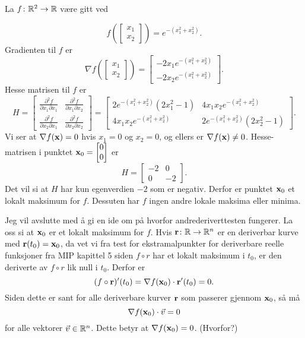 \begin{eksempel}
  La $f \colon \mathbb{R}^2 \to \mathbb{R}$ være gitt ved

  $$f(\begin{bmatrix} x_1 \\ x_2 \end{bmatrix}) =
  e^{-(x_1^2 + x_2^2)}.$$
  Gradienten til $f$ er
  $$\nabla f(\begin{bmatrix} x_1 \\ x_2 \end{bmatrix}) =
  \begin{bmatrix} -2x_1 e^{-(x_1^2 + x_2^2)} \\ -2x_2 e^{-(x_1^2 + x_2^2)} \end{bmatrix}.$$
  Hesse matrisen til $f$ er
  $$H = \begin{bmatrix}
    \frac{\partial^2 f}{\partial x_1 \partial x_1} & \frac{\partial^2 f}{\partial x_1 \partial x_2} \\
    \frac{\partial^2 f}{\partial x_2 \partial x_1} & \frac{\partial^2 f}{\partial x_2 \partial x_2}
    \end{bmatrix} = \begin{bmatrix}
    2e^{-(x_1^2 + x_2^2)}(2x_1^2 - 1) & 4x_1x_2 e^{-(x_1^2 + x_2^2)} \\
    4x_1x_2 e^{-(x_1^2 + x_2^2)} & 2e^{-(x_1^2 + x_2^2)}(2x_2^2 - 1)
    \end{bmatrix}.$$
    Vi ser at
    $\nabla f(\mathbf{x}) = 0$ hvis $x_1 = 0$ og $x_2 = 0$, og ellers er $\nabla f(\mathbf{x}) \neq 0$.
    Hesse-matrisen i punktet $\mathbf{x}_0 = \begin{bmatrix}0\\0\end{bmatrix}$ er
    $$H = \begin{bmatrix}
      -2 & 0 \\
      0 & -2
    \end{bmatrix}.$$
    Det vil si at $H$ har kun egenverdien $-2$ som er negativ. Derfor er punktet $\mathbf{x}_0$ et 
    lokalt maksimum for $f$. Dessuten har $f$ ingen andre lokale maksima eller minima.
\end{eksempel}

Jeg vil avslutte med å gi en ide om på hvorfor andrederiverttesten fungerer.
La oss si at $\mathbf{x}_0$ er et lokalt maksimum for $f$. Hvis $\mathbf{r} \colon \mathbb{R} \to \mathbb{R}^n$ er en 
deriverbar kurve med $\mathbf{r}(t_0) = \mathbf{x}_0$, da vet vi fra test for ekstramalpunkter for
deriverbare reelle funksjoner fra MIP kapittel 5 siden $f \circ r$  har et lokalt maksimum i $t_0$,
er den deriverte av $f \circ r$ lik null i $t_0$. Derfor er
$$(f \circ \mathbf{r})'(t_0) = \nabla f(\mathbf{x}_0) \cdot \mathbf{r}'(t_0) = 0.$$
Siden dette er sant for alle deriverbare kurver $\mathbf{r}$ som passerer gjennom $\mathbf{x}_0$, så må
$$\nabla f(\mathbf{x}_0) \cdot \vec{v} = 0$$
for alle vektorer $\vec{v} \in \mathbb{R}^n$. Dette betyr at $\nabla f(\mathbf{x}_0) = 0$. (Hvorfor?)

